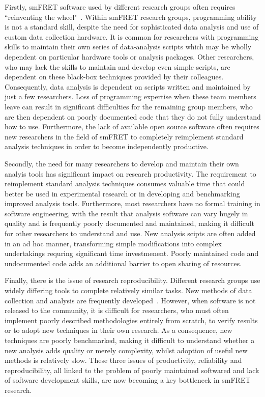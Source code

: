 
Firstly, smFRET software used by different research groups often requires ``reinventing the wheel"~\cite{mirams13}. Within smFRET research groups, programming ability is not a standard skill, despite the need for sophisticated data analysis and use of custom data collection hardware. It is common for researchers with programming skills to maintain their own series of data-analysis scripts which may be wholly dependent on particular hardware tools or analysis packages. Other researchers, who may lack the skills to maintain and develop even simple scripts, are dependent on these black-box techniques provided by their colleagues. Consequently, data analysis is dependent on scripts written and maintained by just a few researchers. Loss of programming expertise when these team members leave can result in significant difficulties for the remaining group members, who are then dependent on poorly documented code that they do not fully understand how to use. Furthermore, the lack of available open source software often requires new researchers in the field of smFRET to completely reimplement standard analysis techniques in order to become independently productive.    

Secondly, the need for many researchers to develop and maintain their own analyis tools has significant impact on research productivity. The requirement to reimplement standard analysis techniques consumes valuable time that could better be used in experimental research or in developing and benchmarking improved analysis tools. Furthermore, most researchers have no formal training in software engineering, with the result that analysis software can vary hugely in quality and is frequently poorly documented and maintained, making it difficult for other researchers to understand and use. New analysis scipts are often added in an ad hoc manner, transforming simple modifications into complex undertakings requring significant time investmenent. Poorly maintained code and undocumented code adds an additional barrier to open sharing of resources.  

Finally, there is the issue of research reproducibility. Different research groups use widely differing tools to complete relatively similar tasks. New methods of data collection and analysis are frequently developed~\cite{kapanidis05, nir06, sisamakis2010}. However, when software is not released to the community, it is difficult for researchers, who must often implement poorly described methodologies entirely from scratch, to verify results or to adopt new techniques in their own research. As a consequence, new techniques are poorly benchmarked, making it difficult to understand whether a new analysis adds quality or merely complexity, whilst adoption of useful new methods is relatively slow. These three issues of productivity, reliability and reproducibility, all linked to the problem of poorly maintained softwared and lack of software development skills, are now becoming a key bottleneck in smFRET research.  


